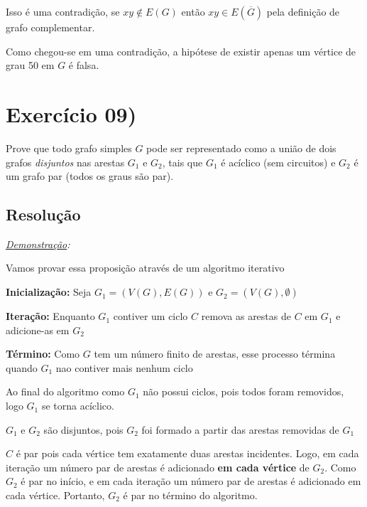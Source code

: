 \documentclass[12pt, a4paper]{article}
\begin{document}
Isso é uma contradição, se $xy \notin E(G)$ então $xy \in E(\overline{G})$
pela definição de grafo complementar.

Como chegou-se em uma contradição, a hipótese de existir apenas um vértice
de grau 50 em $G$ é falsa.
\newpage

\section*{Exercício 09)}
Prove que todo grafo simples $G$ pode ser representado como a união de 
dois grafos \textit{disjuntos} nas arestas $G_1$ e $G_2$, tais que $G_1$ é acíclico (sem circuitos) 
e $G_2$ é um grafo par (todos os graus são par).
\subsection*{Resolução}

\textit{\underline{Demonstração}:}

Vamos provar essa proposição através de um algoritmo iterativo

\textbf{Inicialização:} Seja $G_1 = (V(G), E(G))$ e $G_2 = (V(G), \emptyset)$

\textbf{Iteração:} Enquanto $G_1$ contiver um ciclo $C$ remova as arestas
de $C$ em $G_1$ e adicione-as em $G_2$

\textbf{Término:} Como $G$ tem um número finito de arestas, esse processo
términa quando $G_1$ nao contiver mais nenhum ciclo

\bigskip

Ao final do algoritmo como $G_1$ não possui ciclos, pois todos foram 
removidos, logo $G_1$ se torna acíclico.

$G_1$ e $G_2$ são disjuntos, pois $G_2$ foi formado a partir das arestas
removidas de $G_1$

$C$ é par pois cada vértice tem exatamente duas arestas incidentes. Logo,
em cada iteração um número par de arestas é adicionado \textbf{em cada vértice}
de $G_2$. Como $G_2$ é par no início, e em cada iteração um número par
de arestas é adicionado em cada vértice. Portanto, $G_2$ é par no término
do algoritmo.
\end{document}
